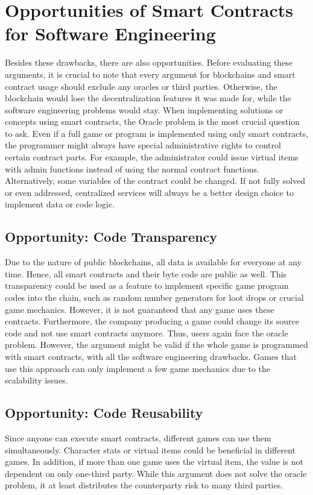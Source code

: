 \section{Opportunities of Smart Contracts for Software Engineering}
Besides these drawbacks, there are also opportunities.
Before evaluating these arguments, it is crucial to note that every argument for blockchains and smart contract usage should exclude any oracles or third parties.
Otherwise, the blockchain would lose the decentralization features it was made for, while the software engineering problems would stay.
When implementing solutions or concepts using smart contracts, the Oracle problem is the most crucial question to ask.
Even if a full game or program is implemented using only smart contracts, the programmer might always have special administrative rights to control certain contract parts.
For example, the administrator could issue virtual items with admin functions instead of using the normal contract functions. Alternatively, some variables of the contract could be changed.
If not fully solved or even addressed, centralized services will always be a better design choice to implement data or code logic.

\subsection{Opportunity: Code Transparency}
Due to the nature of public blockchains, all data is available for everyone at any time.
Hence, all smart contracts and their byte code are public as well.
This transparency could be used as a feature to implement specific game program codes into the chain, such as random number generators for loot drops or crucial game mechanics.
However, it is not guaranteed that any game uses these contracts.
Furthermore, the company producing a game could change its source code and not use smart contracts anymore.
Thus, users again face the oracle problem.
However, the argument might be valid if the whole game is programmed with smart contracts, with all the software engineering drawbacks.
Games that use this approach can only implement a few game mechanics due to the scalability issues. \cite{8848111}

\subsection{Opportunity: Code Reusability}
Since anyone can execute smart contracts, different games can use them simultaneously.
Character stats or virtual items could be beneficial in different games. 
In addition, if more than one game uses the virtual item, the value is not dependent on only one-third party.
While this argument does not solve the oracle problem, it at least distributes the counterparty risk to many third parties. \cite{8848111}

